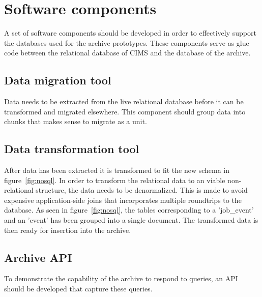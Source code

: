 \section{Software components}
A set of software components should be developed in order to effectively support the databases used for the archive prototypes. These components serve as glue code between the relational database of CIMS and the database of the archive. 
\subsection{Data migration tool}
Data needs to be extracted from the live relational database before it can be transformed and migrated elsewhere. This component should group data into chunks that makes sense to migrate as a unit. 

\subsection{Data transformation tool}
After data has been extracted it is transformed to fit the new schema in figure~\ref{fig:nosql}. In order to transform the relational data to an viable  non-relational structure, the data needs to be denormalized. This is made to avoid expensive application-side joins that incorporates multiple roundtrips to the database. As seen in figure~\ref{fig:nosql}, the tables corresponding to a 'job\_event' and an 'event' has been grouped into a single document. The transformed data is then ready for insertion into the archive. 

\subsection{Archive API}
To demonstrate the capability of the archive to respond to queries, an API should be developed that capture these queries. 



